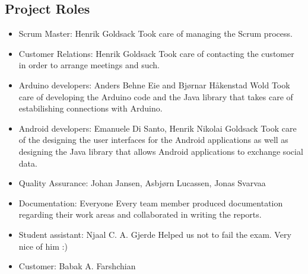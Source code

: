\subsection{Project Roles}
\begin{itemize}
	\item{Scrum Master:} Henrik Goldsack\newline
	Took care of managing the Scrum process.
	
	\item{Customer Relations:} Henrik Goldsack\newline
	Took care of contacting the customer in order to arrange meetings and such.

	\item{Arduino developers:} Anders Behne Eie and Bjørnar Håkenstad Wold\newline
	Took care of developing the Arduino code and the Java library that takes
	care of estabilishing connections with Arduino.

	\item{Android developers:} Emanuele Di Santo, Henrik Nikolai Goldsack\newline
	Took care of the designing the user interfaces for the Android applications
	as well as designing the Java library that allows Android applications
	to exchange social data.
	
	\item{Quality Assurance:} Johan Jansen, Asbjørn Lucassen, Jonas Svarvaa\newline

	\item{Documentation:} Everyone\newline
	Every team member produced documentation regarding their work areas and
	collaborated in writing the reports.

	\item{Student assistant:} Njaal C. A. Gjerde\newline
	Helped us not to fail the exam. Very nice of him :)

	\item{Customer:} Babak A. Farshchian
\end{itemize}

